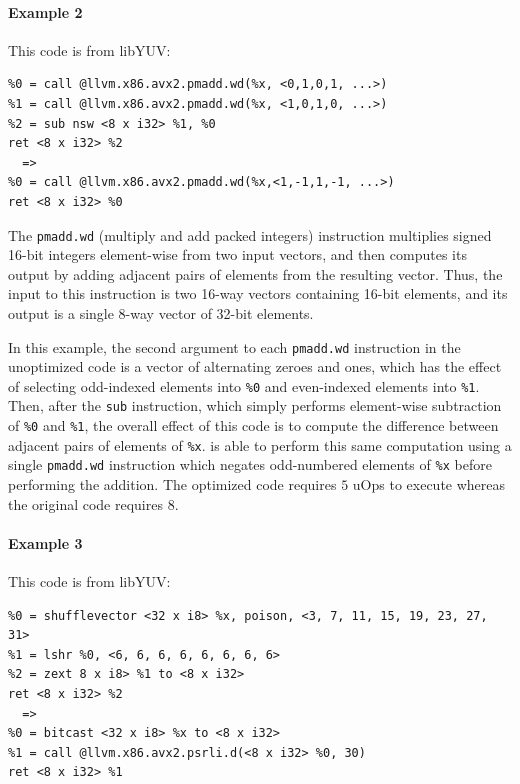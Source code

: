 \paragraph*{Example 2}

This code is from libYUV:

{\begin{quoting}\begin{Verbatim}
%0 = call @llvm.x86.avx2.pmadd.wd(%x, <0,1,0,1, ...>)
%1 = call @llvm.x86.avx2.pmadd.wd(%x, <1,0,1,0, ...>)
%2 = sub nsw <8 x i32> %1, %0
ret <8 x i32> %2
  =>
%0 = call @llvm.x86.avx2.pmadd.wd(%x,<1,-1,1,-1, ...>)
ret <8 x i32> %0
\end{Verbatim}
\end{quoting}}

The \texttt{pmadd.wd} (multiply and add packed integers) instruction multiplies
signed 16-bit integers element-wise from two input vectors, and then
computes its output by adding adjacent pairs of elements from the
resulting vector.
%
Thus, the input to this instruction is two 16-way vectors containing
16-bit elements, and its output is a single 8-way vector of 32-bit
elements.


In this example, the second argument to each \texttt{pmadd.wd}
instruction in the unoptimized code is a vector of alternating zeroes
and ones, which has the effect of selecting odd-indexed elements into
\texttt{\%0} and even-indexed elements into \texttt{\%1}.
%
Then, after the \texttt{sub} instruction, which simply performs
element-wise subtraction of \texttt{\%0} and \texttt{\%1}, the overall
effect of this code is to compute the difference between adjacent
pairs of elements of \texttt{\%x}.
%
\minotaur{} is able to perform this same computation using a single
\texttt{pmadd.wd} instruction which negates odd-numbered elements of
\texttt{\%x} before performing the addition.
%
The optimized code requires $5$ uOps to execute whereas the original
code requires $8$.


\paragraph*{Example 3}

This code is from libYUV:

{\begin{quoting}\begin{Verbatim}
%0 = shufflevector <32 x i8> %x, poison, <3, 7, 11, 15, 19, 23, 27, 31>
%1 = lshr %0, <6, 6, 6, 6, 6, 6, 6, 6>
%2 = zext 8 x i8> %1 to <8 x i32>
ret <8 x i32> %2
  =>
%0 = bitcast <32 x i8> %x to <8 x i32>
%1 = call @llvm.x86.avx2.psrli.d(<8 x i32> %0, 30)
ret <8 x i32> %1
\end{Verbatim}
\end{quoting}}

